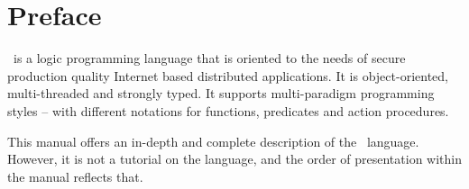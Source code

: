 \chapter*{Preface}
\go\ is a logic programming language that is oriented to the needs of secure production quality Internet based distributed applications. It is object-oriented, multi-threaded and strongly typed. It supports multi-paradigm programming styles -- with different notations for functions, predicates and action procedures.

This manual offers an in-depth and complete description of the \go\ language. However, it is not a tutorial on the language, and the order of presentation within the manual reflects that.

 